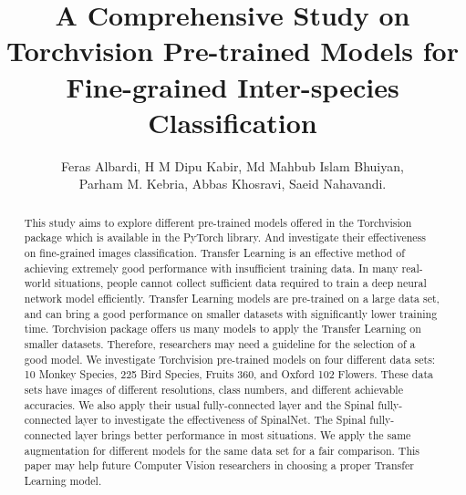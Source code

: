 \documentclass[conference]{IEEEtran}
\begin{document}
\title{\vspace{0.25in}A Comprehensive Study on Torchvision Pre-trained Models for Fine-grained Inter-species Classification}
\author{Feras Albardi, H M Dipu Kabir, Md Mahbub Islam Bhuiyan,\\ Parham M. Kebria, Abbas Khosravi,  Saeid Nahavandi.  \\







}













\maketitle


\begin{abstract}
This study aims to explore different pre-trained models offered in the Torchvision package which is available in the PyTorch library. And investigate their effectiveness on fine-grained images classification. Transfer Learning is an effective method of achieving extremely good performance with insufficient training data. In many real-world situations, people cannot collect sufficient data required to train a deep neural network model efficiently. Transfer Learning models are pre-trained on a large data set, and can bring a good performance on smaller datasets with significantly lower training time. Torchvision package offers us many models to apply the Transfer Learning on smaller datasets. Therefore, researchers may need a guideline for the selection of a good model. We investigate Torchvision pre-trained models on four different data sets: 10 Monkey Species, 225 Bird Species, Fruits 360, and Oxford 102 Flowers. These data sets have images of different resolutions, class numbers, and different achievable accuracies. We also apply their usual fully-connected layer and the Spinal fully-connected layer to investigate the effectiveness of SpinalNet. The Spinal fully-connected layer brings better performance in most situations. We apply the same augmentation for different models for the same data set for a fair comparison. This paper may help future Computer Vision researchers in choosing a proper Transfer Learning model.
\end{abstract}
\end{document}

